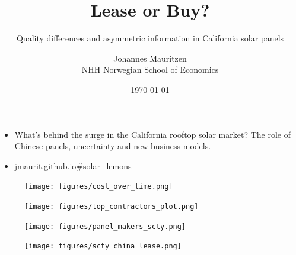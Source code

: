\documentclass{beamer}
\title{Lease or Buy?}
\subtitle{Quality differences and asymmetric information in California solar panels}
\author[J. Mauritzen]{Johannes Mauritzen \\ NHH Norwegian School of Economics}
\institute[NHH]{
  \texttt{jmaurit@gmail.com}
}
\date{\today}
\begin{document}
\begin{frame}[plain]
  \titlepage
\end{frame}



\begin{frame}[plain]
	\begin{itemize}
	\item[] What's behind the surge in the California rooftop solar market? The role of Chinese panels, uncertainty and new business models.
	\item[] \url{jmaurit.github.io\#solar_lemons}
	\end{itemize}
\end{frame}

\begin{frame}[plain]
	\begin{figure}
	\texttt{[image: figures/cost\_over\_time.png]}
	\end{figure}
\end{frame}

\begin{frame}[plain]
	\begin{figure}
		\texttt{[image: figures/top\_contractors\_plot.png]}
	\end{figure}	
\end{frame}

\begin{frame}[plain]
	\begin{figure}
		\texttt{[image: figures/panel\_makers\_scty.png]}
	\end{figure}
\end{frame}

\begin{frame}[plain]
	\begin{figure}
		\texttt{[image: figures/scty\_china\_lease.png]}
	\end{figure}
\end{frame}
\end{document}
